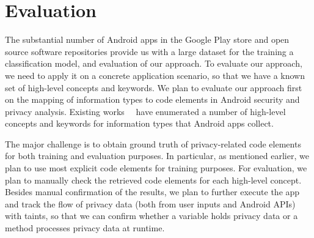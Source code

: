 \section{Evaluation}

The substantial number of Android apps in the Google Play store and open source software repositories provide us with a large dataset for the training a classification model, and evaluation of our approach. To evaluate our approach, we need to apply it on a concrete application scenario, so that we have a known set of high-level concepts and keywords. We plan to evaluate our approach first on the mapping of information types to code elements in Android security and privacy analysis. Existing works~\cite{rasthofer2014machine}~\cite{huang2015supor} have enumerated a number of high-level concepts and keywords for information types that Android apps collect. 

The major challenge is to obtain ground truth of privacy-related code elements for both training and evaluation purposes. In particular, as mentioned earlier, we plan to use most explicit code elements for training purposes. For evaluation, we plan to manually check the retrieved code elements for each high-level concept. Besides manual confirmation of the results, we plan to further execute the app and track the flow of privacy data (both from user inputs and Android APIs) with taints, so that we can confirm whether a variable holds privacy data or a method processes privacy data at runtime.

